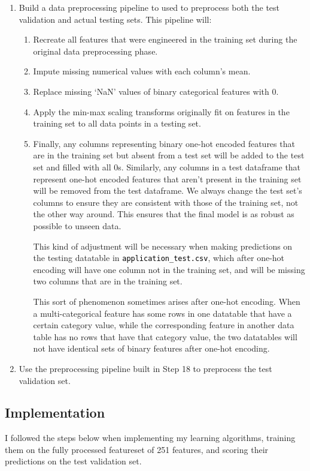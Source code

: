 \documentclass[12pt, letterpaper]{article}
\begin{document}
\begin{enumerate}
  \item Build a data preprocessing pipeline to used to preprocess both the test validation and actual testing sets. This pipeline will:
  \begin{enumerate}
    \item Recreate all features that were engineered in the training set during the original data preprocessing phase.
    \item Impute missing numerical values with each column's mean.
    \item Replace missing `NaN' values of binary categorical features with 0. \item Apply the min-max scaling transforms originally fit on features in the training set to all data points in a testing set.
    \item Finally, any columns representing binary one-hot encoded features that are in the training set but absent from a test set will be added to the test set and filled with all 0s. Similarly, any columns in a test dataframe that represent one-hot encoded features that aren't present in the training set will be removed from the test dataframe. We always change the test set's columns to ensure they are consistent with those of the training set, not the other way around. This ensures that the final model is as robust as possible to unseen data.

    This kind of adjustment will be necessary when making predictions on the testing datatable in \colorbox{backcolor}{\textcolor{black}{\texttt{application_test.csv}}}, which after one-hot encoding will have one column not in the training set, and will be missing two columns that are in the training set.

    This sort of phenomenon sometimes arises after one-hot encoding. When a multi-categorical feature has some rows in one datatable that have a certain category value, while the corresponding feature in another data table has no rows that have that category value, the two datatables will not have identical sets of binary features after one-hot encoding.
  \end{enumerate}
  \item Use the preprocessing pipeline built in Step 18 to preprocess the test validation set.
\end{enumerate}

\subsection{Implementation}
I followed the steps below when implementing my learning algorithms, training them on the fully processed featureset of 251 features, and scoring their predictions on the test validation set.
\end{document}
